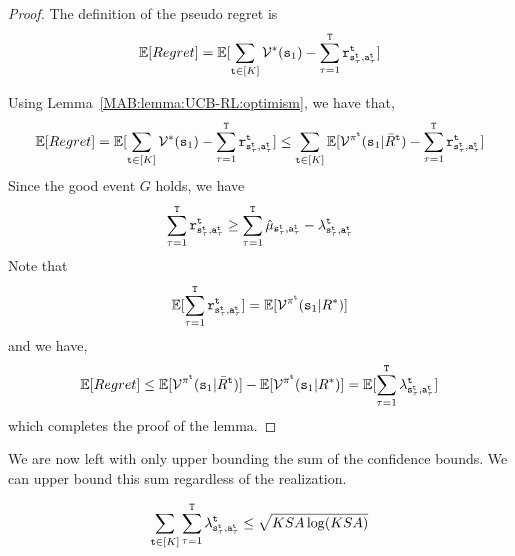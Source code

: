 \begin{proof}
    The definition of the pseudo regret is
    \[
    \mathbb{E}[Regret]= \mathbb{E}[\sum_{{\tt t}\in [K]} \mathcal{V}^*({\tt s}_1)-\sum_{\tau=1}^{\tt T} {\tt r}^{\tt t}_{{\tt s}_\tau^{\tt t},{\tt a}_\tau^{\tt t}}]
    \]

Using Lemma~\ref{MAB:lemma:UCB-RL:optimism}, we have that,
    \[
    \mathbb{E}[Regret]= \mathbb{E}[\sum_{{\tt t}\in [K]} \mathcal{V}^*({\tt s}_1)-\sum_{\tau=1}^{\tt T} {\tt r}^{\tt t}_{{\tt s}_\tau^{\tt t},{\tt a}_\tau^{\tt t}}]
    \leq
    \sum_{{\tt t}\in [K]}
    \mathbb{E}[\mathcal{V}^{\pi^{\tt t}}({\tt s}_1|\bar{R}^{\tt t})
    -\sum_{\tau=1}^{\tt T} {\tt r}^{\tt t}_{{\tt s}_\tau^{\tt t},{\tt a}_\tau^{\tt t}}]
    \]
Since the good event $G$ holds, we have 
\[
\sum_{\tau=1}^{\tt T} {\tt r}^{\tt t}_{{\tt s}_\tau^{\tt t},{\tt a}_\tau^{\tt t}} \geq \sum_{\tau=1}^{\tt T}
 \hat{\mu}_{{\tt s}_\tau^{\tt t},{\tt a}_\tau^{\tt t}}-\lambda^{\tt t}_{{\tt s}_\tau^{\tt t},{\tt a}_\tau^{\tt t}}
\]
Note that
\[
\mathbb{E}[\sum_{\tau=1}^{\tt T} {\tt r}^{\tt t}_{{\tt s}_\tau^{\tt t},{\tt a}_\tau^{\tt t}} ] =\mathbb{E}[\mathcal{V}^{\pi^{\tt t}}({\tt s}_1|R^*)]
\]
and we have,
\[
\mathbb{E}[Regret]\leq \mathbb{E}[\mathcal{V}^{\pi^{\tt t}}({\tt s}_1|\bar{R}^{\tt t})] -
\mathbb{E}[\mathcal{V}^{\pi^{\tt t}}({\tt s}_1|R^*)]=
\mathbb{E}[\sum_{\tau=1}^{\tt T} \lambda^{\tt t}_{{\tt s}_\tau^{\tt t},{\tt a}_\tau^{\tt t}} ]
\]
which completes the proof of the lemma.
\end{proof}

We are now left with only upper bounding the sum of the confidence bounds.
We can upper bound this sum regardless of the realization. 

\begin{lemma}
    \[
    \sum_{{\tt t}\in [K]} \sum_{\tau=1}^{\tt T}
\lambda^{\tt t}_{{\tt s}_\tau^{\tt t},{\tt a}_\tau^{\tt t}}
    \leq \sqrt{KSA\log (KSA)}
    \]
\end{lemma}

